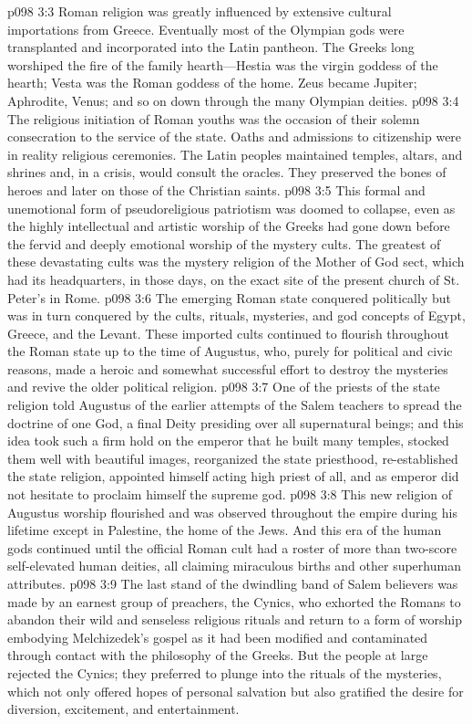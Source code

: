 \vs p098 3:3 Roman religion was greatly influenced by extensive cultural importations from Greece. Eventually most of the Olympian gods were transplanted and incorporated into the Latin pantheon. The Greeks long worshiped the fire of the family hearth---Hestia was the virgin goddess of the hearth; Vesta was the Roman goddess of the home. Zeus became Jupiter; Aphrodite, Venus; and so on down through the many Olympian deities.
\vs p098 3:4 The religious initiation of Roman youths was the occasion of their solemn consecration to the service of the state. Oaths and admissions to citizenship were in reality religious ceremonies. The Latin peoples maintained temples, altars, and shrines and, in a crisis, would consult the oracles. They preserved the bones of heroes and later on those of the Christian saints.
\vs p098 3:5 This formal and unemotional form of pseudoreligious patriotism was doomed to collapse, even as the highly intellectual and artistic worship of the Greeks had gone down before the fervid and deeply emotional worship of the mystery cults. The greatest of these devastating cults was the mystery religion of the Mother of God sect, which had its headquarters, in those days, on the exact site of the present church of St. Peter’s in Rome.
\pc \vs p098 3:6 The emerging Roman state conquered politically but was in turn conquered by the cults, rituals, mysteries, and god concepts of Egypt, Greece, and the Levant. These imported cults continued to flourish throughout the Roman state up to the time of Augustus, who, purely for political and civic reasons, made a heroic and somewhat successful effort to destroy the mysteries and revive the older political religion.
\vs p098 3:7 One of the priests of the state religion told Augustus of the earlier attempts of the Salem teachers to spread the doctrine of one God, a final Deity presiding over all supernatural beings; and this idea took such a firm hold on the emperor that he built many temples, stocked them well with beautiful images, reorganized the state priesthood, re\hyp{}established the state religion, appointed himself acting high priest of all, and as emperor did not hesitate to proclaim himself the supreme god.
\vs p098 3:8 This new religion of Augustus worship flourished and was observed throughout the empire during his lifetime except in Palestine, the home of the Jews. And this era of the human gods continued until the official Roman cult had a roster of more than two\hyp{}score self\hyp{}elevated human deities, all claiming miraculous births and other superhuman attributes.
\pc \vs p098 3:9 The last stand of the dwindling band of Salem believers was made by an earnest group of preachers, the Cynics, who exhorted the Romans to abandon their wild and senseless religious rituals and return to a form of worship embodying Melchizedek’s gospel as it had been modified and contaminated through contact with the philosophy of the Greeks. But the people at large rejected the Cynics; they preferred to plunge into the rituals of the mysteries, which not only offered hopes of personal salvation but also gratified the desire for diversion, excitement, and entertainment.
